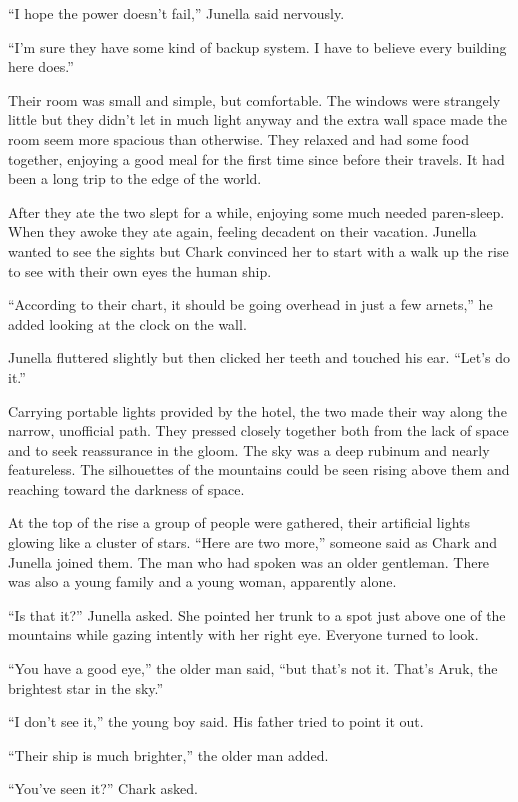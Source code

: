 ``I hope the power doesn't fail,'' Junella said nervously.

``I'm sure they have some kind of backup system. I have to believe every building here does.''

Their room was small and simple, but comfortable. The windows were strangely little but they
didn't let in much light anyway and the extra wall space made the room seem more spacious than
otherwise. They relaxed and had some food together, enjoying a good meal for the first time
since before their travels. It had been a long trip to the edge of the world.

After they ate the two slept for a while, enjoying some much needed paren-sleep. When they awoke
they ate again, feeling decadent on their vacation. Junella wanted to see the sights but Chark
convinced her to start with a walk up the rise to see with their own eyes the human ship.

``According to their chart, it should be going overhead in just a few arnets,'' he added looking
at the clock on the wall.

Junella fluttered slightly but then clicked her teeth and touched his ear. ``Let's do it.''

Carrying portable lights provided by the hotel, the two made their way along the narrow,
unofficial path. They pressed closely together both from the lack of space and to seek
reassurance in the gloom. The sky was a deep rubinum and nearly featureless. The silhouettes of
the mountains could be seen rising above them and reaching toward the darkness of space.

At the top of the rise a group of people were gathered, their artificial lights glowing like a
cluster of stars. ``Here are two more,'' someone said as Chark and Junella joined them. The man
who had spoken was an older gentleman. There was also a young family and a young woman,
apparently alone.

``Is that it?'' Junella asked. She pointed her trunk to a spot just above one of the mountains
while gazing intently with her right eye. Everyone turned to look.

``You have a good eye,'' the older man said, ``but that's not it. That's Aruk, the brightest
star in the sky.''

``I don't see it,'' the young boy said. His father tried to point it out.

``Their ship is much brighter,'' the older man added.

``You've seen it?'' Chark asked.

